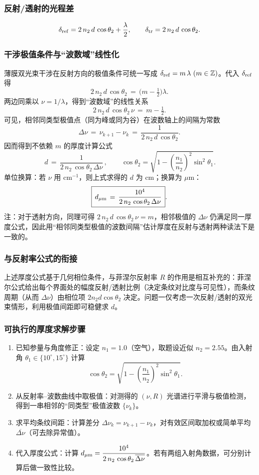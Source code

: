 \documentclass[withoutpreface,bwprint]{cumcmthesis} %
\begin{document}
\subsubsection{反射/透射的光程差}
\[
    \delta_{\rm ref}=2\,n_2\,d\,\cos\theta_2+\frac{\lambda}{2},\qquad
    \delta_{\rm tr}=2\,n_2\,d\,\cos\theta_2.
\]
\subsubsection{干涉极值条件与“波数域”线性化}
薄膜双光束干涉在反射方向的极值条件可统一写成 \(\delta_{\rm ref}=m\,\lambda\ (m\in\mathbb{Z})\)。代入 \(\delta_{\rm ref}\) 得
\[
    2\,n_2\,d\,\cos\theta_2 \,=\, \Big(m-\tfrac{1}{2}\Big)\lambda.
\]
两边同乘以 \(\nu=1/\lambda\)，得到“波数域”的线性关系
\[
    2\,n_2\,d\,\cos\theta_2\,\nu \,=\, m-\tfrac{1}{2}.
\]
可见，相邻同类型极值点（同为峰或同为谷）在波数轴上的间隔为常数
\[
    \Delta \nu \,=\, \nu_{k+1}-\nu_k \,=\, \frac{1}{2\,n_2\,d\,\cos\theta_2}.
\]
因而得到不依赖 \(m\) 的厚度计算公式
\[
    \boxed{\,d \,=\, \frac{1}{2\,n_2\,\cos\theta_2\,\Delta \nu}\,},\qquad
    \cos\theta_2=\sqrt{1-\left(\frac{n_1}{n_2}\right)^2\sin^2\theta_1}.
\]
单位换算：若 \(\nu\) 用 cm\(^{-1}\)，则上式求得的 \(d\) 为 cm；换算为 \(\mu\)m：
\[
    \boxed{\,d_{\mu{\rm m}} \,=\, \frac{10^4}{2\,n_2\,\cos\theta_2\,\Delta \nu}\,}.
\]
注：对于透射方向，同理可得 \(2\,n_2\,d\,\cos\theta_2\,\nu=m\)，相邻极值的 \(\Delta\nu\) 仍满足同一厚度公式，因此用“相邻同类型极值的波数间隔”估计厚度在反射与透射两种读法下是一致的。

\subsubsection{与反射率公式的衔接}
上述厚度公式基于几何相位条件，与菲涅尔反射率 \(R\) 的作用是相互补充的：菲涅尔公式给出每个界面处的幅度反射/透射比例（决定条纹对比度与可见性），而条纹周期（从而 \(\Delta\nu\)）由相位项 \(2n_2 d \cos\theta_2\) 决定。问题一仅考虑一次反射/透射的双光束情形，利用极值间距即可稳健求 \(d\)。

\subsubsection{可执行的厚度求解步骤}
\begin{enumerate}
    \item 已知参量与角度修正：设定 \(n_1=1.0\)（空气），取题设近似 \(n_2=2.55\)。由入射角 \(\theta_1 \in \{10^\circ, 15^\circ\}\) 计算
          \[
              \cos\theta_2=\sqrt{1-\left(\frac{n_1}{n_2}\right)^2\sin^2\theta_1}.
          \]
    \item 从反射率–波数曲线中取极值：对测得的 \((\nu, R)\) 光谱进行平滑与极值检测，得到一串相邻的“同类型”极值波数 \(\{\nu_k\}\)。
    \item 求平均条纹间距：计算差分 \(\Delta \nu_k=\nu_{k+1}-\nu_k\)，对有效区间取加权或简单平均 \(\overline{\Delta\nu}\)（可去除异常值）。
    \item 代入厚度公式：计算 \(d_{\mu{\rm m}}=\dfrac{10^4}{2\,n_2\,\cos\theta_2\,\overline{\Delta\nu}}\)。若有两组入射角数据，可分别计算后做一致性比较。
\end{enumerate}
\end{document}
